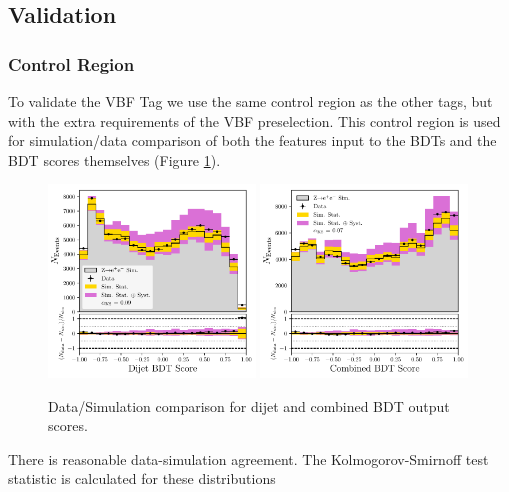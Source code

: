 \subsection{Validation}
\subsubsection{\Zee Control Region}
To validate the VBF Tag we use the same \Zee control region as the other tags, but with the extra requirements of the VBF preselection. 
This control region is used for simulation/data comparison of both the features input to the BDTs and the BDT scores themselves (Figure \ref{fig:event_categorisation:zee_bdt_score_validation}). 
\begin{figure}[h!]
    \begin{center}
        \includegraphics[width=0.49\textwidth]{figures/event_selection/dijet_BDT_zee_PS.pdf}
        \includegraphics[width=0.49\textwidth]{figures/event_selection/combined_BDT_zee_PS.pdf}
    \end{center}
    \caption{Data/Simulation comparison for dijet and combined BDT output scores.}
    \label{fig:event_categorisation:zee_bdt_score_validation}
\end{figure}
There is reasonable data-simulation agreement. The Kolmogorov-Smirnoff test statistic is calculated for these distributions 


